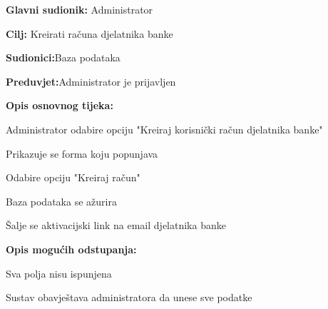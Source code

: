 \noindent {}
\begin{packed_item}
	
	\item \textbf{Glavni sudionik: }{Administrator}
	\item  \textbf{Cilj:} {Kreirati računa djelatnika banke}
	\item  \textbf{Sudionici:}{Baza podataka}
	\item  \textbf{Preduvjet:}{Administrator je prijavljen}
	\item  \textbf{Opis osnovnog tijeka:}
	
	\item[] \begin{packed_enum}
		
		\item {Administrator odabire opciju "Kreiraj korisnički račun djelatnika banke"}
		\item {Prikazuje se forma koju popunjava} 
		\item {Odabire opciju "Kreiraj račun"}
		\item {Baza podataka se ažurira}
		\item {Šalje se aktivacijski link na email djelatnika banke}
	\end{packed_enum}
	
	\item  \textbf{Opis mogućih odstupanja:}
	
	\item[] \begin{packed_item}
		
		\item[2.a]{Sva polja nisu ispunjena}
		\item[] \begin{packed_enum}
			
			\item Sustav obavještava administratora da unese sve podatke
			
		\end{packed_enum}
	\end{packed_item}
\end{packed_item}
\eject 
\noindent {}
